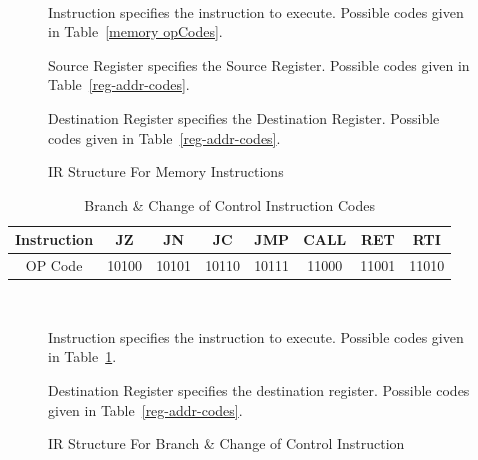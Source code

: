 \documentclass[12pt]{article}
\theoremstyle{plain}
\theoremstyle{definition}
\begin{document}
    \begin{figure}[H]
        \centering
        \caption{IR Structure For Memory Instructions}
        \label{IR-memory}
        \vspace{0.5 cm}
         \\
        \vspace{0.5 cm}
        \begin{regdesc}\begin{reglist}            
            \item [Instruction] specifies the instruction to execute. Possible codes given in Table~\ref{memory opCodes}.
            \item [Source Register] specifies the Source Register. Possible codes given in Table~\ref{reg-addr-codes}.
            \item [Destination Register] specifies the Destination Register. Possible codes given in Table~\ref{reg-addr-codes}.
        \end{reglist}\end{regdesc}
    \end{figure}
    \begin{table}[H]
        \centering
        \begin{tabular}{|c|c|c|c|c|c|c|c|}
            \hline
            Instruction & JZ  & JN & JC  & JMP  & CALL  & RET  & RTI \\ \hline
            OP Code     & 10100 & 10101 & 10110 & 10111 & 11000 & 11001 & 11010 \\ \hline
        \end{tabular}
        \caption{Branch & Change of Control Instruction Codes}
        \label{Branch Opcodes}
    \end{table}
    \begin{figure}[H]
        \centering
        \caption{IR Structure For Branch & Change of Control Instruction}
        \label{IR-Branch}
        \vspace{0.5 cm}
         \\
        \vspace{0.5 cm}
        \begin{regdesc}\begin{reglist}            
            \item [Instruction] specifies the instruction to execute. Possible codes given in Table~\ref{Branch Opcodes}.
            \item [Destination Register] specifies the destination register. Possible codes given in Table~\ref{reg-addr-codes}.
        \end{reglist}\end{regdesc}
    \end{figure}
\pagebreak
\end{document}
